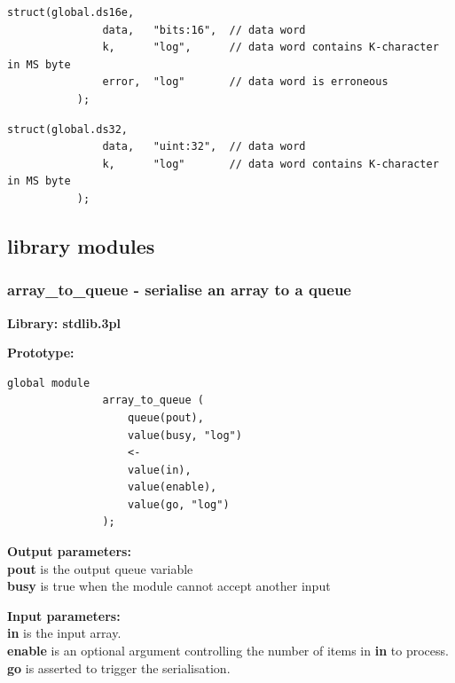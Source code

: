         \begin{lstlisting}[gobble=8, language=threepl]
           struct(global.ds16e,
               data,   "bits:16",  // data word
               k,      "log",      // data word contains K-character in MS byte
               error,  "log"       // data word is erroneous
           );
        \end{lstlisting}

        \begin{lstlisting}[gobble=8, language=threepl]
           struct(global.ds32,
               data,   "uint:32",  // data word
               k,      "log"       // data word contains K-character in MS byte
           );
        \end{lstlisting}


    \subsection{library modules}
    
        \subsubsection{array\_to\_queue - serialise an array to a
                                                    queue}\label{sec:lmarraytoqueue}


            {\bf Library: stdlib.3pl}

            {\bf Prototype:} \\
            \vsp
            \begin{lstlisting}[gobble=12, language=threepl]
               global module
               array_to_queue (
                   queue(pout),
                   value(busy, "log")
                   <-
                   value(in),
                   value(enable),
                   value(go, "log")
               );
            \end{lstlisting}

            {\bf Output parameters:} \\
            {\bf pout} is the output queue variable\\
            {\bf busy} is true when the module cannot accept another input

            {\bf Input parameters:} \\
            {\bf in} is the input array.\\
            {\bf enable} is an optional argument controlling the number of
            items in {\bf in} to process.\\
            {\bf go} is asserted to trigger the serialisation.

